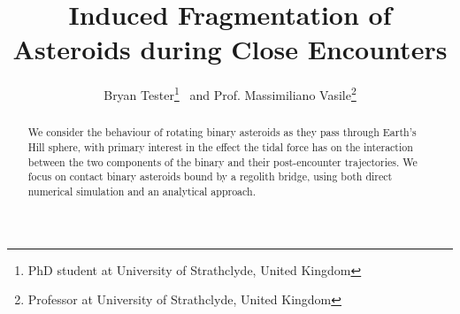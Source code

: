 \documentclass[letterpaper, preprint, paper,11pt]{AAS}	%
\begin{document}
\title{\textsf{\textbf{Induced Fragmentation of Asteroids during Close Encounters}}}
\author{\textsf{Bryan Tester}\thanks{PhD student at University of Strathclyde, United Kingdom}
\ and \textsf{Prof. Massimiliano Vasile}\thanks{Professor at University of Strathclyde, United Kingdom}}

\maketitle{} 		


\begin{abstract}
We consider the behaviour of rotating binary asteroids as they pass through Earth's Hill sphere, with primary interest in the effect the tidal force has on the interaction between the two components of the binary and their post-encounter trajectories. We focus on contact binary asteroids bound by a regolith bridge, using both direct numerical simulation and an analytical approach.
\end{abstract}
\end{document}
